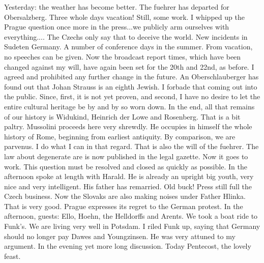 
Yesterday: the weather has become better. The fuehrer has departed for Obersalzberg. Three whole days vacation! Still, some work. I whipped up the Prague question once more in the press...we publicly arm ourselves with everything.... The Czechs only say that to deceive the world.  New incidents in Sudeten Germany. A number of conference days in the summer. From vacation, no speeches can be given. Now the broadcast report times, which have been changed against my will, have again been set for the 20th and 22nd, as before. I agreed and prohibited any further change in the future. An Oberschlauberger has found out that Johan Strauss is an eighth Jewish. I forbade that coming out into the public. Since, first, it is not yet proven, and second, I have no desire to let the entire cultural heritage be by and by so worn down. In the end, all that remains of our history is Widukind, Heinrich der Lowe and Rosenberg. That is a bit paltry. Mussolini proceeds here very shrewdly. He occupies in himself the whole history of Rome, beginning from earliest antiquity. By comparison, we are parvenus. I do what I can in that regard. That is also the will of the fuehrer. The law about degenerate are is now published in the legal gazette. Now it goes to work. This question must be resolved and closed as quickly as possible. In the afternoon spoke at length with Harald. He is already an upright big youth, very nice and very intelligent. His father has remarried. Old buck! Press still full the Czech business. Now the Slovaks are also making noises under Father Hlinka. That is very good. Prague expresses its regret to the German protest. In the afternoon, guests: Ello, Hoehn, the Helldorffs and Arents. We took a boat ride to Funk's. We are living very well in Potsdam. I riled Funk up, saying that Germany should no longer pay Dawes and Youngzinsen. He was very attuned to my argument. In the evening yet more long discussion. Today Pentecost, the lovely feast.